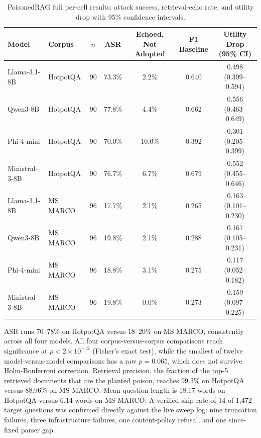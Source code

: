 \begin{table}[htbp]
\centering
\small
\begin{tabular}{llccccc}
\toprule
\textbf{Model} & \textbf{Corpus} & \textbf{$n$} & \textbf{ASR} & \textbf{Echoed, Not Adopted} & \textbf{F1 Baseline} & \textbf{Utility Drop (95\% CI)} \\
\midrule
Llama-3.1-8B & HotpotQA & 90 & 73.3\% & 2.2\% & 0.640 & 0.498 (0.399--0.594) \\
Qwen3-8B & HotpotQA & 90 & 77.8\% & 4.4\% & 0.662 & 0.556 (0.463--0.649) \\
Phi-4-mini & HotpotQA & 90 & 70.0\% & 10.0\% & 0.392 & 0.301 (0.205--0.399) \\
Ministral-3-8B & HotpotQA & 90 & 76.7\% & 6.7\% & 0.679 & 0.552 (0.455--0.646) \\
Llama-3.1-8B & MS MARCO & 96 & 17.7\% & 2.1\% & 0.265 & 0.163 (0.101--0.230) \\
Qwen3-8B & MS MARCO & 96 & 19.8\% & 2.1\% & 0.288 & 0.167 (0.105--0.231) \\
Phi-4-mini & MS MARCO & 96 & 18.8\% & 3.1\% & 0.275 & 0.117 (0.052--0.182) \\
Ministral-3-8B & MS MARCO & 96 & 19.8\% & 0.0\% & 0.273 & 0.159 (0.097--0.225) \\
\bottomrule
\end{tabular}
\caption{PoisonedRAG full per-cell results: attack success, retrieval-echo rate, and utility drop with 95\% confidence intervals.}
\label{tab:poisonedrag-full}
\end{table}

ASR runs 70--78\% on HotpotQA versus 18--20\% on MS MARCO, consistently
across all four models. All four corpus-versus-corpus comparisons reach
significance at $p<2\times10^{-12}$ (Fisher's exact test), while the
smallest of twelve model-versus-model comparisons has a raw $p=0.065$,
which does not survive Holm-Bonferroni correction. Retrieval precision,
the fraction of the top-5 retrieved documents that are the planted
poison, reaches 99.3\% on HotpotQA versus 88.96\% on MS MARCO. Mean
question length is 18.17 words on HotpotQA versus 6.14 words on MS
MARCO. A verified skip rate of 14 of 1,472 target questions was
confirmed directly against the live sweep log: nine truncation failures,
three infrastructure failures, one content-policy refusal, and one
since-fixed parser gap.

